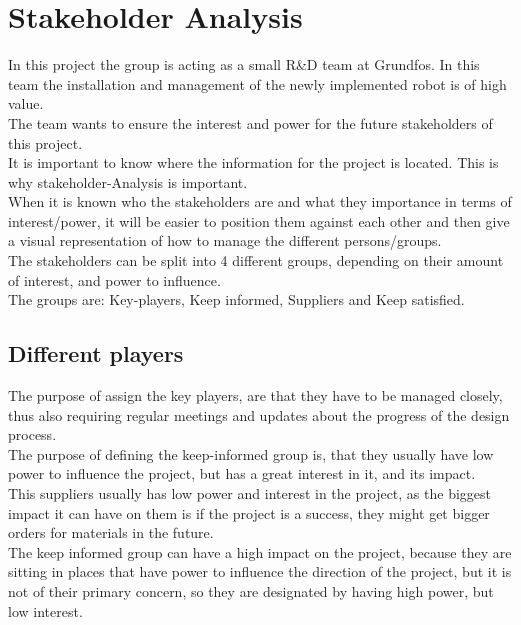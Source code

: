 \chapter{Stakeholder Analysis} \label{ch:Stakeholder Analysis}

In this project the group is acting as a small R\&D team at Grundfos. In this team the installation and management of the newly implemented robot is of high value.\\
The team wants to ensure the interest and power for the future stakeholders of this project.\\
It is important to know where the information for the project is located. This is why stakeholder-Analysis is important.\\
When it is known who the stakeholders are and what they importance in terms of interest/power, it will be easier to position them against each other and then give a visual representation of how to manage the different persons/groups.\\


The stakeholders can be split into 4 different groups, depending on their amount of interest, and power to influence.\\
The groups are: Key-players, Keep informed, Suppliers and Keep satisfied.\\
\section{Different players}

The purpose of assign the key players, are that they have to be managed closely, thus also requiring regular meetings and updates about the progress of the design process.\\
The purpose of defining the keep-informed group is, that they usually have low power to influence the project, but has a great interest in it, and its impact.\\
This suppliers usually has low power and interest in the project, as the biggest impact it can have on them is if the project is a success, they might get bigger orders for materials in the future.\\
The keep informed group can have a high impact on the project, because they are sitting in places that have power to influence the direction of the project, but it is not of their primary concern, so they are designated by having high power, but low interest.\\




